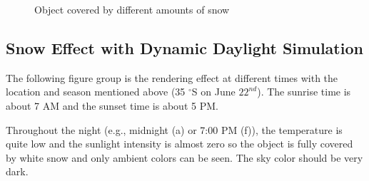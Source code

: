 \documentclass{article}
\begin{document}
\begin{figure}[h]
  \centering
  \hfill
  \hfill
  \caption{Object covered by different amounts of snow}
  \label{fig:9}
\end{figure}

\subsection {Snow Effect with Dynamic Daylight Simulation}
\label{headings}
The following figure group is the rendering effect at different times with the location and season mentioned 
above (35 $^{\circ}$S on June \(22^{nd}\)). The sunrise time is about 7 AM and the sunset time is about 5 PM.

Throughout the night (e.g., midnight (a) or 7:00 PM (f)), the temperature is quite low and the sunlight 
intensity is almost zero so the object is fully covered by white snow and only ambient colors can be seen. The
sky color should be very dark.
\end{document}
